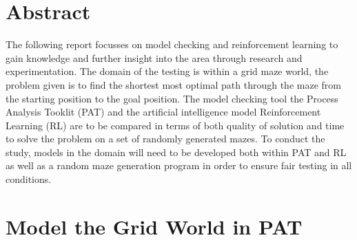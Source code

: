 \documentclass[twoside, 12pt, a4paper]{article}
\begin{document}


\pagestyle{fancy}
\fancyfoot[C]{\thepage}
\fancyfoot[L,R]{}
\setcounter{page}{1}

\newpage


\tableofcontents



\newpage
{}
\setcounter{page}{1}
\pagestyle{fancy}

\fancyfoot[LE,RO]{\thepage}
\fancyfoot[C]{}
\section{Abstract}
The following report focusses on model checking and reinforcement learning to gain knowledge and further insight into the area through research and experimentation. The domain of the testing is within a grid maze world, the problem given is to find the shortest most optimal path through the maze from the starting position to the goal position. The model checking tool the Process Analysis Tooklit (PAT) and the artificial intelligence model Reinforcement Learning (RL) are to be compared in terms of both quality of solution and time to solve the problem on a set of randomly generated mazes. To conduct the study, models in the domain will need to be developed both within PAT and RL as well as a random maze generation program in order to ensure fair testing in all conditions.

\section{Model the Grid World in PAT}  \label{CSys_AandD}
\end{document}
